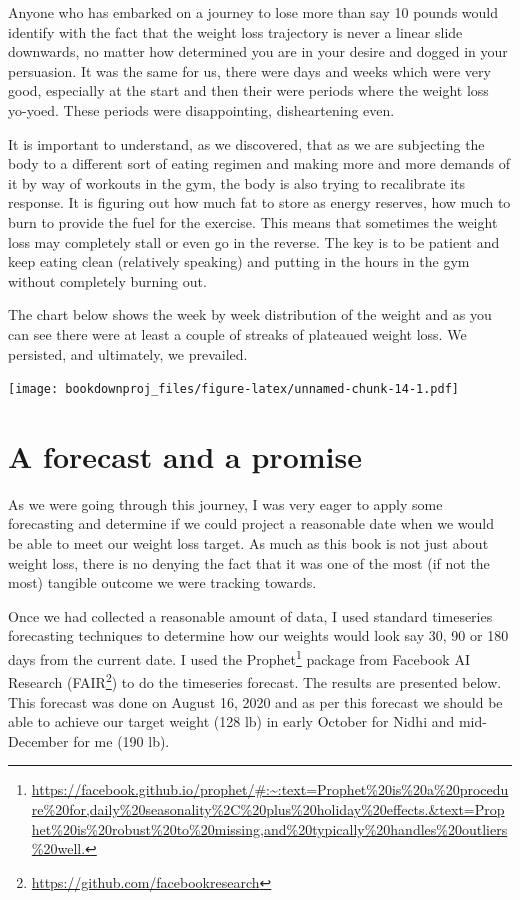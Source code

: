 \documentclass[
  oneside]{book}
\DeclareRobustCommand{\href}[2]{#2\footnote{\url{#1}}}
\begin{document}
Anyone who has embarked on a journey to lose more than say 10 pounds would identify with the fact that the weight loss trajectory is never a linear slide downwards, no matter how determined you are in your desire and dogged in your persuasion. It was the same for us, there were days and weeks which were very good, especially at the start and then their were periods where the weight loss yo-yoed. These periods were disappointing, disheartening even.

It is important to understand, as we discovered, that as we are subjecting the body to a different sort of eating regimen and making more and more demands of it by way of workouts in the gym, the body is also trying to recalibrate its response. It is figuring out how much fat to store as energy reserves, how much to burn to provide the fuel for the exercise. This means that sometimes the weight loss may completely stall or even go in the reverse. The key is to be patient and keep eating clean (relatively speaking) and putting in the hours in the gym without completely burning out.

The chart below shows the week by week distribution of the weight and as you can see there were at least a couple of streaks of plateaued weight loss. We persisted, and ultimately, we prevailed.

\texttt{[image: bookdownproj\_files/figure-latex/unnamed-chunk-14-1.pdf]}

\hypertarget{a-forecast-and-a-promise}{%
\section{A forecast and a promise}\label{a-forecast-and-a-promise}}

As we were going through this journey, I was very eager to apply some forecasting and determine if we could project a reasonable date when we would be able to meet our weight loss target. As much as this book is not just about weight loss, there is no denying the fact that it was one of the most (if not the most) tangible outcome we were tracking towards.

Once we had collected a reasonable amount of data, I used standard timeseries forecasting techniques to determine how our weights would look say 30, 90 or 180 days from the current date. I used the \href{https://facebook.github.io/prophet/\#:~:text=Prophet\%20is\%20a\%20procedure\%20for,daily\%20seasonality\%2C\%20plus\%20holiday\%20effects.\&text=Prophet\%20is\%20robust\%20to\%20missing,and\%20typically\%20handles\%20outliers\%20well.}{Prophet} package from Facebook AI Research (\href{https://github.com/facebookresearch}{FAIR}) to do the timeseries forecast. The results are presented below. This forecast was done on August 16, 2020 and as per this forecast we should be able to achieve our target weight (128 lb) in early October for Nidhi and mid-December for me (190 lb).
\end{document}

